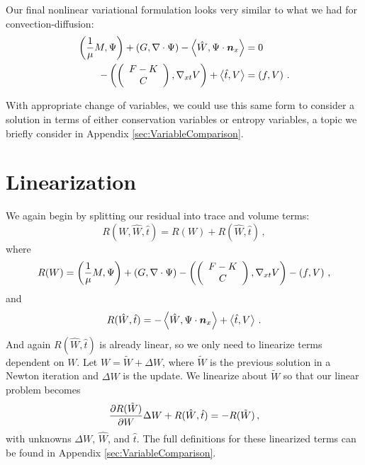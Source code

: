 \documentclass[Dissertation.tex]{subfiles}
\begin{document}
Our final nonlinear variational formulation looks very similar to what we had for convection-diffusion:
\begin{align*}
\left( \frac{1}{\mu}M,\Psi \right)+\left( G,\nabla\cdot\Psi \right)-\left\langle \hat W,\Psi\cdot\boldsymbol n_x \right\rangle&=0\\
-\left( \left( \begin{array}{c} F-K\\ C\\ \end{array} \right),\nabla_{xt} V \right)+\left\langle \hat t,V \right\rangle&=\left( f,V \right)\,.
\end{align*}

With appropriate change of variables, we could use this same form to consider a solution in terms
of either conservation variables or entropy variables, 
a topic we briefly consider in Appendix \ref{sec:VariableComparison}.


\section{Linearization}
We again begin by splitting our residual into trace and volume terms:
\[
R(W,\hat W,\hat t) = R(W) + R(\hat W,\hat t)\,,
\]
where
\[
R(W)=
\left( \frac{1}{\mu}M,\Psi \right)+\left( G,\nabla\cdot\Psi \right)
-\left( \left( \begin{array}{c} F-K\\ C\\ \end{array} \right),\nabla_{xt} V \right)-\left( f,V \right)\,,
\]
and
\[
R(\hat W,\hat t)=
-\left\langle \hat W,\Psi\cdot\boldsymbol n_x \right\rangle
+\left\langle \hat t,V \right\rangle\,.
\]
And again $R(\hat W,\hat t)$ is already linear, so we only need to linearize terms dependent on $W$.
Let $W=\tilde W+\Delta W$, where $\tilde W$ is the previous solution in a Newton iteration and 
$\Delta W$ is the update. We linearize about $\tilde W$ so that our linear problem becomes
\[
\frac{\partial R(\tilde W)}{\partial W}\Delta W+R(\hat W,\hat t)=-R(\tilde W)\,,
\]
with unknowns $\Delta W$, $\hat W$, and $\hat t$.
The full definitions for these linearized terms can be found in Appendix \ref{sec:VariableComparison}.
\end{document}
